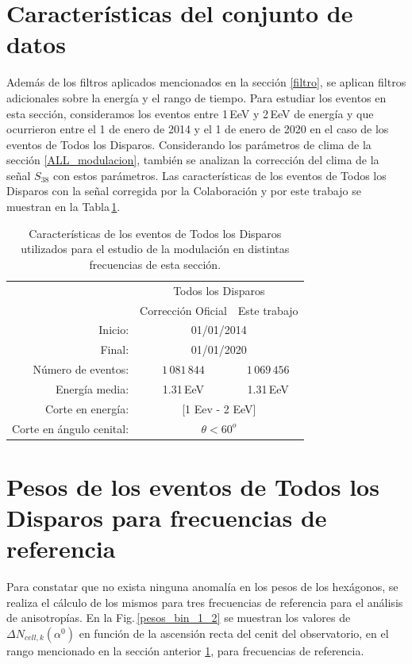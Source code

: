 \section{Características del conjunto de datos} \label{specs}

	Además de los filtros aplicados mencionados en la sección \ref{filtro}, se aplican filtros adicionales sobre la energía y el rango de tiempo. Para estudiar los eventos en esta sección, consideramos los eventos entre 1\,EeV y 2\,EeV de energía y que ocurrieron entre el 1 de enero de 2014 y el 1 de enero de 2020 en el caso de los eventos de Todos los Disparos. Considerando los parámetros de clima de la sección \ref{ALL_modulacion}, también se analizan la corrección del clima de la señal $S_{38}$ con estos parámetros. Las características de los eventos de Todos los Disparos con la señal corregida por la Colaboración y por este trabajo se muestran en la Tabla\,\ref{tabla:caracteristicas_ALL-1-2}.

	\begin{table}[H]
		\centering
		\begin{tabular}{r|c|c|} \cline{2-3}
			&\multicolumn{2}{c|}{Todos los Disparos } \\ \cline{2-3}
			& Corrección Oficial &  Este trabajo\\ \cline{2-3}
		Inicio:              & \multicolumn{2}{c|}{01/01/2014} \\ 
		Final:               & \multicolumn{2}{c|}{01/01/2020}  \\ 
		Número de eventos:   & $1\,081\,844$ & $1\,069\,456$		\\ 
		Energía media:       & 1.31\,EeV    & 1.31\,EeV\\ 
		Corte en energía:    & \multicolumn{2}{c|}{[1 Eev - 2 EeV]}      				\\ 
		Corte en ángulo cenital:		& \multicolumn{2}{c|}{$\theta < 60^o$} 				\\ \cline{2-3}
		\end{tabular}
	\caption{Características de los eventos de Todos los Disparos utilizados para el estudio de la modulación en distintas frecuencias de esta sección. } \label{tabla:caracteristicas_ALL-1-2}
	\end{table}

	
\section{Pesos de los eventos de Todos los Disparos para frecuencias de referencia}
Para constatar que no exista ninguna anomalía en los pesos de los hexágonos, se realiza el cálculo de los mismos para tres frecuencias de referencia para el análisis de anisotropías.  En la Fig.\,\ref{pesos_bin_1_2} se muestran los valores de  $\Delta N_{cell,k}(\alpha^0)$ en función de la ascensión recta del cenit del observatorio, en el rango mencionado en la sección anterior \ref{specs}, para frecuencias de referencia. 
			 
